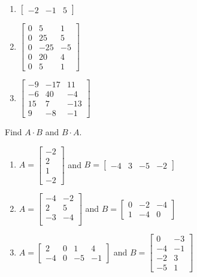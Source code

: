 \begin{Answer}[ref = mult_mat1]
\begin{enumerate}
    \item $\begin{bmatrix}
        -2 & -1 & 5
    \end{bmatrix}$
    \item $\begin{bmatrix}
        0 & 5 & 1\\
        0 & 25 & 5\\
        0 & -25 & -5\\
        0 & 20 & 4\\
        0 & 5 & 1
    \end{bmatrix}$
    \item $\begin{bmatrix}
        -9 & -17 & 11\\
        -6 & 40 & -4\\
        15 & 7 & -13\\
        9 & -8 & -1
    \end{bmatrix}$
\end{enumerate}
\end{Answer}

\begin{Exercise}[title = {Multiplying Matrices 2}, label = mult_mat2]
Find $\mathbf{\mathit{A}} \cdot \mathbf{\mathit{B}}$ and $\mathbf{\mathit{B}} \cdot \mathbf{\mathit{A}}$. 
\begin{enumerate}
\item $\mathbf{\mathit{A}} = \begin{bmatrix}
-2\\
2\\
1\\
-2
\end{bmatrix}$ and $\mathbf{\mathit{B}} = \begin{bmatrix}
-4 & 3 & -5 & -2
\end{bmatrix}$
\item $\mathbf{\mathit{A}} = \begin{bmatrix}
-4 & -2\\
2 & 5\\
-3 & -4\\
\end{bmatrix}$ and $\mathbf{\mathit{B}} = \begin{bmatrix}
0 & -2 & -4\\
1 & -4 & 0
\end{bmatrix}$
\item $\mathbf{\mathit{A}} = \begin{bmatrix}
2 & 0 & 1 & 4\\
-4 & 0 & -5 & -1
\end{bmatrix}$ and $\mathbf{\mathit{B}} = \begin{bmatrix}
0 & -3\\
-4 & -1\\
-2 & 3\\
-5 & 1
\end{bmatrix}$
\end{enumerate}
\end{Exercise}

